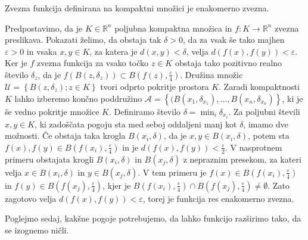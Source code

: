 \documentclass[mat1]{fmfdelo}
\newcommand{\R}{\mathbb R}
\newcommand{\0}{\underline{0}}
\newcommand{\pA}{\mathcal A}
\newcommand{\pU}{\mathcal U}
\begin{document}
\begin{trditev}\label{trd:zvjeenakzv}
Zvezna funkcija definirana na kompaktni množici je enakomerno zvezna.
\end{trditev}
\begin{dokaz}
Predpostavimo, da je $K \in \R^n$ poljubna kompaktna množica in $f : K \to \R^n$ zvezna preslikava. Pokazati želimo, da obstaja tak $\delta > 0$, da za vsak še tako majhen $\varepsilon > 0$ in vsaka $x, y \in K$, za katera je $d(x, y) < \delta$, velja $d(f(x), f(y)) < \varepsilon$. Ker je $f$ zvezna funkcija za vsako točko $z \in K$ obstaja tako pozitivno realno število $\delta_z$, da je $f(B(z, \delta_z)) \subset B(f(z), \frac{\varepsilon}{4})$. Družina množic $\pU = \left \{ B(z, \delta_z); z \in K \right \}$ tvori odprto pokritje prostora $K$. Zaradi kompaktnosti $K$ lahko izberemo končno poddružino $\pA =  \left \{ (B(x_1, \delta_{x_1}), \dots, B(x_n, \delta_{x_n}) \right \}$, ki je še vedno pokritje množice $K$. Definiramo število $\delta = \min_i \delta_{x_i}$. Za poljubni števili $x, y \in K$, ki zadoščata pogoju sta med seboj oddaljeni manj kot $\delta$, imamo dve možnosti. Če obstaja taka krogla $B(x_i, \delta)$, da je $x, y \in B(x_i, \delta)$, potem sta $f(x), f(y) \in B(f(x_i), \frac{\varepsilon}{4})$ in je $d(f(x), f(y)) < \frac{\varepsilon}{2}$. V nasprotnem primeru obstajata krogli  $B(x_i, \delta)$ in $B(x_j, \delta)$ z nepraznim presekom, za kateri velja $x \in B(x_i, \delta)$ in $y \in B(x_j, \delta)$. V tem primeru je $f(x) \in B(f(x_i), \frac{\varepsilon}{4})$ in $f(y) \in B(f(x_j), \frac{\varepsilon}{4})$, kjer je $B(f(x_i), \frac{\varepsilon}{4}) \cap B(f(x_j), \frac{\varepsilon}{4}) \neq \emptyset$. Zato zagotovo velja $d(f(x), f(y)) < \varepsilon$, torej je funkcija res enakomerno zvezna.
\end{dokaz}
Poglejmo sedaj, kakšne pogoje potrebujemo, da lahko funkcijo razširimo tako, da se izognemo ničli.

\end{document}
